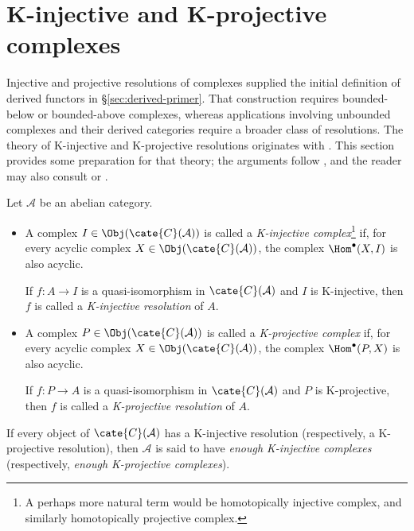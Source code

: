 
\section{K-injective and K-projective complexes}\label{sec:K-injectives}
\hypertarget{o014.aljabr2.chapter3.k-injectives}{ }

Injective and projective resolutions of complexes supplied the initial
definition of derived functors in \S\ref{sec:derived-primer}. That construction
requires bounded-below or bounded-above complexes, whereas applications
involving unbounded complexes and their derived categories require a broader
class of resolutions. The theory of K-injective and K-projective resolutions
originates with \cite{Spa88}. This section provides some preparation for that
theory; the arguments follow \cite{stacks}, and the reader may also consult
\cite[Chapter 14]{KS06} or \cite{BN93}.

\begin{definition}[N.\ Spaltenstein]\label{def:K-resolutions}
	Let $\mathcal{A}$ be an abelian category.
	\begin{itemize}
		\item A complex $I\in\Obj(\cate{C}(\mathcal{A}))$ is called a
		\emph{K-injective complex}\footnote{A perhaps more natural term
		would be homotopically injective complex, and similarly
		homotopically projective complex.} if, for every acyclic complex
		$X\in\Obj(\cate{C}(\mathcal{A}))$, the complex
		$\Hom^\bullet(X,I)$ is also acyclic.

		If $f:A\to I$ is a quasi-isomorphism in
		$\cate{C}(\mathcal{A})$ and $I$ is K-injective, then $f$ is called
		a \emph{K-injective resolution} of $A$.
		\item A complex $P\in\Obj(\cate{C}(\mathcal{A}))$ is called a
		\emph{K-projective complex} if, for every acyclic complex
		$X\in\Obj(\cate{C}(\mathcal{A}))$, the complex
		$\Hom^\bullet(P,X)$ is also acyclic.

		If $f:P\to A$ is a quasi-isomorphism in
		$\cate{C}(\mathcal{A})$ and $P$ is K-projective, then $f$ is called
		a \emph{K-projective resolution} of $A$.
	\end{itemize}

	If every object of $\cate{C}(\mathcal{A})$ has a K-injective resolution
	(respectively, a K-projective resolution), then $\mathcal{A}$ is said to
	have \emph{enough K-injective complexes} (respectively,
	\emph{enough K-projective complexes}).
\end{definition}

